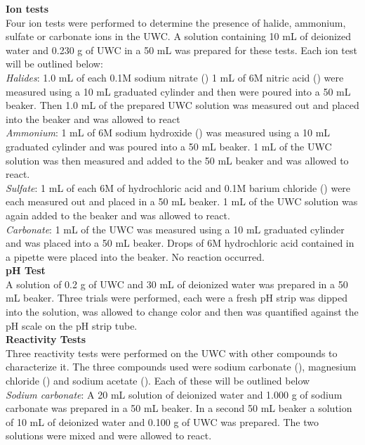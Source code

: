 \documentclass[12pt]{article}
\begin{document}
\vspace{6pt}\textbf{Ion tests}
\\Four ion tests were performed to determine the presence of halide, ammonium, sulfate or carbonate ions in the UWC. A solution containing 10 mL of deionized water and 0.230 g of UWC in a 50 mL was prepared for these tests. Each ion test will be outlined below:
\vspace{6pt}\\\textit{Halides}: 1.0 mL of each 0.1M sodium nitrate () 1 mL of 6M nitric acid () were measured using a 10 mL graduated cylinder and then were poured into a 50 mL beaker. Then 1.0 mL of the prepared UWC solution was measured out and placed into the beaker and was allowed to react
\vspace{10pt}\\
\textit{Ammonium}: 1 mL of 6M sodium hydroxide () was measured using a 10 mL graduated cylinder and was poured into a 50 mL beaker. 1 mL of the UWC solution was then measured and added to the 50 mL beaker and was allowed to react. 
\vspace{10pt}\\\textit{Sulfate}: 1 mL of each 6M of hydrochloric acid and 0.1M barium chloride () were each measured out and placed in a 50 mL beaker. 1 mL of the UWC solution was again added to the beaker and was allowed to react.
\vspace{10pt}\\\textit{Carbonate}: 1 mL of the UWC was measured using a 10 mL graduated cylinder and was placed into a 50 mL beaker. Drops of 6M hydrochloric acid contained in a pipette were placed into the beaker. No reaction occurred.
\vspace{6pt}\\\textbf{pH Test}
\\A solution of 0.2 g of UWC and 30 mL of deionized water was prepared in a 50 mL beaker. Three trials were performed, each were a fresh pH strip was dipped into the solution, was allowed to change color and then was quantified against the pH scale on the pH strip tube. 
\vspace{6pt}\\\textbf{Reactivity Tests}
\\Three reactivity tests were performed on the UWC with other compounds to characterize it. The three compounds used were sodium carbonate (), magnesium chloride () and sodium acetate (). Each of these will be outlined below
\vspace{6pt}\\\textit{Sodium carbonate}: A 20 mL solution of deionized water and 1.000 g of sodium carbonate was prepared in a 50 mL beaker. In a second 50 mL beaker a solution of 10 mL of deionized water and 0.100 g of UWC was prepared. The two solutions were mixed and were allowed to react.
\end{document}

